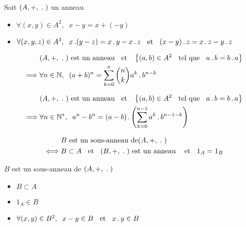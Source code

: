 \begin{dfn}
Soit $(A, +,  \;\operatorname{.}\;)$ un anneau
\begin{itemize}
    \item $\forall (x, y) \in A^2, \;\; x - y = x + (-y)$
    \item $\forall (x, y , z) \in A^3, \;\; x \operatorname{.} (y - z)
        = x \operatorname{.} y - x \operatorname{.} z \;\;\text{ et }\;\;
        (x - y) \operatorname{.} z = x \operatorname{.} z - y \operatorname{.} z$
\end{itemize}
\end{dfn}

\begin{thm}
\begin{align*}
            &(A, +, \;\operatorname{.}\;) \text{ est un anneau} \;\;\text{ et }\;\;
                \left\{(a, b) \in A^2 \;\;\text{ tel que }\;\; a \operatorname{.} b = b \operatorname{.} a\right\} \\
\implies    &\forall n \in \mathbb{N}, \;\;
                (a + b)^n = \sum_{k = 0}^n \binom{n}{k} a^k \operatorname{.} b^{n - k}
\end{align*}
\end{thm}

\begin{prp}
\begin{align*}
            &(A, +, \;\operatorname{.}\;) \text{ est un anneau} \;\;\text{ et }\;\;
                \left\{ (a, b) \in A^2 \;\;\text{ tel que }\;\; a \operatorname{.} b = b \operatorname{.} a \right\} \\
\implies    &\forall n \in \mathbb{N}^*, \;\;
                a^n - b^n = 
                (a - b) \operatorname{.} \left( 
                    \sum_{k = 0}^{n - 1} a^k \operatorname{.} b^{n - 1 - k} \right)
\end{align*}
\end{prp}

\begin{dfn}
\begin{align*}
        &B \text{ est un sous-anneau de} (A, +, \;\operatorname{.}\;) \\
\iff    &B \subset A \;\;\text{ et }\;\; (B, +, \;\operatorname{.}\;) \text{ est un anneau } \;\;\text{ et }\;\; 1_A = 1_B
\end{align*}
\end{dfn}

\pagebreak

\begin{prp}
$B$ est un sous-anneau de $(A, +, \;\operatorname{.}\;)$ \ssi
\begin{itemize}
    \item $B \subset A$
    \item $1_A \in B$
    \item $\forall (x, y) \in B^2, \;\; x - y \in B \;\;\text{ et }\;\; x \operatorname{.} y \in B$
\end{itemize}
\end{prp}

